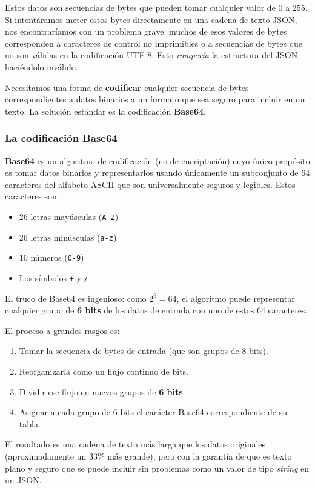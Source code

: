 Estos datos son secuencias de bytes que pueden tomar cualquier valor de 0 a 255. Si intentáramos meter estos bytes directamente en una cadena de texto JSON, nos encontraríamos con un problema grave: muchos de esos valores de bytes corresponden a caracteres de control no imprimibles o a secuencias de bytes que no son válidas en la codificación UTF-8. Esto \textit{rompería} la estructura del JSON, haciéndolo inválido.

Necesitamos una forma de \textbf{codificar} cualquier secuencia de bytes correspondientes a datos binarios a un formato que sea seguro para incluir en un texto. La solución estándar es la codificación \textbf{Base64}.

\subsubsection{La codificación Base64}
\textbf{Base64} es un algoritmo de codificación (no de encriptación) cuyo único propósito es tomar datos binarios y representarlos usando únicamente un subconjunto de 64 caracteres del alfabeto ASCII que son universalmente seguros y legibles. Estos caracteres son:
\begin{itemize}
    \item 26 letras mayúsculas (\texttt{A-Z})
    \item 26 letras minúsculas (\texttt{a-z})
    \item 10 números (\texttt{0-9})
    \item Los símbolos \texttt{+} y \texttt{/}
\end{itemize}
El truco de Base64 es ingenioso: como $2^6 = 64$, el algoritmo puede representar cualquier grupo de \textbf{6 bits} de los datos de entrada con uno de estos 64 caracteres. 

El proceso a grandes rasgos es:

\begin{enumerate}
    \item Tomar la secuencia de bytes de entrada (que son grupos de 8 bits).
    \item Reorganizarla como un flujo continuo de bits.
    \item Dividir ese flujo en nuevos grupos de \textbf{6 bits}.
    \item Asignar a cada grupo de 6 bits el carácter Base64 correspondiente de su tabla.
\end{enumerate}
El resultado es una cadena de texto más larga que los datos originales (aproximadamente un 33\% más grande), pero con la garantía de que es texto plano y seguro que se puede incluir sin problemas como un valor de tipo \textit{string} en un JSON.

